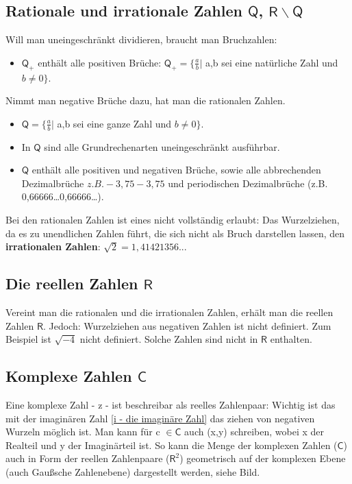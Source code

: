 \documentclass[letterpaper, titlepage]{article}
\begin{document}
\vspace{0.35cm}

\subsection{Rationale und irrationale Zahlen $\mathsf{Q}$, $\mathsf{R \backslash Q}$}\label{Rationale und irrationale Zahlen}
Will man uneingeschränkt dividieren, braucht man Bruchzahlen: 
\begin{itemize}
    \item $\mathsf{Q}_+$ enthält alle positiven Brüche: $\mathsf{Q}_+ = \{\frac{a}{b} \vert$ a,b sei eine natürliche Zahl und $b \neq 0\}$.
\end{itemize} 
Nimmt man negative Brüche dazu, hat man die rationalen Zahlen.
\begin{itemize}
    \item $\mathsf{Q} = \{\frac{a}{b} \vert$ a,b sei eine ganze Zahl und $b \neq 0\}$.
    \item In $\mathsf{Q}$ sind alle Grundrechenarten uneingeschränkt ausführbar.
    \item $\mathsf{Q}$ enthält alle positiven und negativen Brüche, sowie alle abbrechenden Dezimalbrüche \(z.B. -3,75-3,75\) und periodischen Dezimalbrüche (z.B. 0,66666…0,66666…).
\end{itemize}
Bei den rationalen Zahlen ist eines nicht vollständig erlaubt: Das Wurzelziehen, da es zu unendlichen Zahlen führt, die sich nicht als Bruch darstellen lassen, den \textbf{irrationalen Zahlen}: $\sqrt{2}=1,41421356..$. 

\vspace{0.35cm}

\subsection{Die reellen Zahlen $\mathsf{R}$}\label{Die reellen Zahlen}
Vereint man die rationalen und die irrationalen Zahlen, erhält man die reellen Zahlen $\mathsf{R}$. Jedoch: Wurzelziehen aus negativen Zahlen ist nicht definiert. Zum Beispiel ist $\sqrt{-4}$ nicht definiert. Solche Zahlen sind nicht in $\mathsf{R}$ enthalten.

\vspace{0.35cm}

\subsection{Komplexe Zahlen $\mathsf{C}$}\label{Komplexe Zahlen}
Eine komplexe Zahl - z - ist beschreibar als reelles Zahlenpaar:  Wichtig ist das mit der imaginären Zahl \ref{i - die imaginäre Zahl} das ziehen von negativen Wurzeln möglich ist. Man kann für c $\in \mathsf{C}$ auch (x,y) schreiben, wobei x der Realteil und y der Imaginärteil ist. So kann die Menge der komplexen Zahlen ($\mathsf{C}$) auch in Form der reellen Zahlenpaare ($\mathsf{R}^2$) geometrisch auf der komplexen Ebene (auch Gaußsche Zahlenebene) dargestellt werden, siehe Bild.
\end{document}
